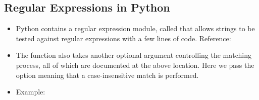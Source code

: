 \documentclass[letterpaper,10pt,english,openany]{sphinxmanual}
\begin{document}
\subsection{Regular Expressions in Python}
\label{\detokenize{introduction_to_python/pattern_matching_with_regular_expressions:regular-expressions-in-python}}\begin{itemize}
\item {} 
Python contains a regular expression module, called  that
allows strings to be tested against regular expressions with a few
lines of code. Reference: 

\item {} 
The  function also takes another optional argument
controlling the matching process, all of which are documented at the
above location. Here we pass the  option meaning
that a case-insensitive match is performed.

\item {} 
Example:

\end{itemize}

\begin{sphinxVerbatim}[commandchars=\\\{\}]
 

  
       

  
 
 

   
 
 
\end{sphinxVerbatim}
\end{document}
